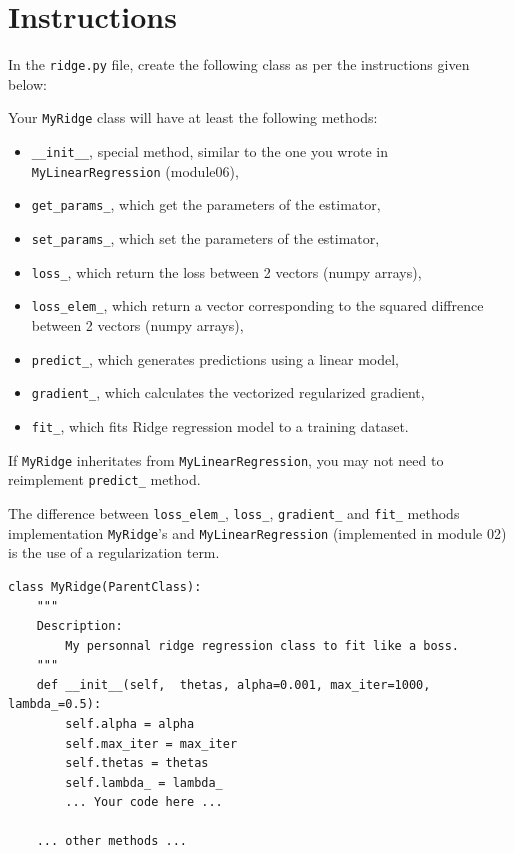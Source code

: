 \documentclass{42-en}
\begin{document}
\section*{Instructions}
In the \texttt{ridge.py} file, create the following class as per the instructions given below:

Your \texttt{MyRidge} class will have at least the following methods:
\begin{itemize}
  \item \texttt{\_\_init\_\_}, special method, similar to the one you wrote in \texttt{MyLinearRegression} (module06),
  \item \texttt{get\_params\_}, which get the parameters of the estimator, 
  \item \texttt{set\_params\_}, which set the parameters of the estimator,
  \item \texttt{loss\_}, which return the loss between 2 vectors (numpy arrays),
  \item \texttt{loss\_elem\_}, which return a vector corresponding to the squared diffrence between 2 vectors (numpy arrays),  
  \item \texttt{predict\_}, which generates predictions using a linear model,
  \item \texttt{gradient\_}, which calculates the vectorized regularized gradient,
  \item \texttt{fit\_}, which fits Ridge regression model to a training dataset.
\end{itemize}

If \texttt{MyRidge} inheritates from \texttt{MyLinearRegression}, you may not need to reimplement \texttt{predict\_} method.

The difference between \texttt{loss\_elem\_}, \texttt{loss\_}, \texttt{gradient\_} and \texttt{fit\_} methods implementation \texttt{MyRidge}'s and \texttt{MyLinearRegression} (implemented in module 02) is the use of a regularization term.

\begin{verbatim}
class MyRidge(ParentClass):
	"""
	Description:
		My personnal ridge regression class to fit like a boss.
	"""
	def __init__(self,  thetas, alpha=0.001, max_iter=1000, lambda_=0.5):
		self.alpha = alpha
		self.max_iter = max_iter
		self.thetas = thetas
		self.lambda_ = lambda_
		... Your code here ...

	... other methods ...
\end{verbatim}
\end{document}
